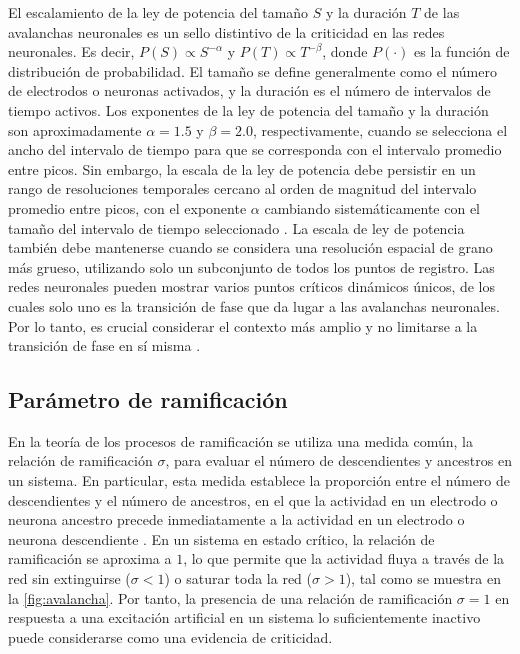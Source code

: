 El escalamiento de la ley de potencia del tamaño $S$ y la duración $T$ de las avalanchas neuronales es un sello distintivo de la criticidad en las redes neuronales. Es decir, $P(S) \propto S^{-\alpha}$  y $P(T) \propto T^{-\beta}$, donde $P(\cdot)$  es la función de distribución de probabilidad. El tamaño se define generalmente como el número de electrodos o neuronas activados, y la duración es el número de intervalos de tiempo activos. Los exponentes de la ley de potencia del tamaño y la duración son aproximadamente $\alpha=1.5$ y $\beta= 2.0$, respectivamente, cuando se selecciona el ancho del intervalo de tiempo para que se corresponda con el intervalo promedio entre picos. Sin embargo, la escala de la ley de potencia debe persistir en un rango de resoluciones temporales cercano al orden de magnitud del intervalo promedio entre picos, con el exponente $\alpha$ cambiando sistemáticamente con el tamaño del intervalo de tiempo seleccionado \cite{beggs_neuronal_2003,pasquale_self-organization_2008}. La escala de ley de potencia también debe mantenerse cuando se considera una resolución espacial de grano más grueso, utilizando solo un subconjunto de todos los puntos de registro. Las redes neuronales pueden mostrar varios puntos críticos dinámicos únicos, de los cuales solo uno es la transición de fase que da lugar a las avalanchas neuronales. Por lo tanto, es crucial considerar el contexto más amplio y no limitarse a la transición de fase en sí misma \cite{kanders_avalanche_2017}.







\subsection{Parámetro de ramificación}



En la teoría de los procesos de ramificación \cite{harris_theory_1963} se utiliza una medida común, la relación de ramificación $\sigma$, para evaluar el número de descendientes y ancestros en un sistema. En particular, esta medida establece la proporción entre el número de descendientes y el número de ancestros, en el que la actividad en un electrodo o neurona ancestro precede inmediatamente a la actividad en un electrodo o neurona descendiente \cite{beggs_neuronal_2003}. En un sistema en estado crítico, la relación de ramificación se aproxima a $1$, lo que permite que la actividad fluya a través de la red sin extinguirse ($\sigma < 1$) o saturar toda la red ($\sigma > 1$), tal como se muestra en la \cref{fig:avalancha}. Por tanto, la presencia de una relación de ramificación $\sigma = 1$ en respuesta a una excitación artificial en un sistema lo suficientemente inactivo puede considerarse como una evidencia de criticidad.

